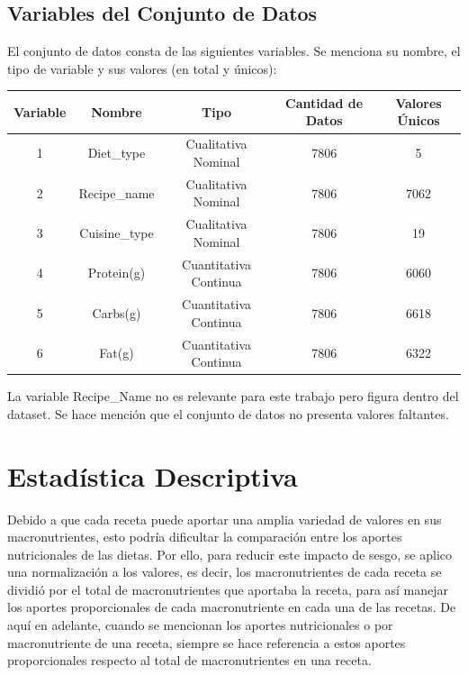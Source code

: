 \documentclass[12pt,a4paper]{article}
\begin{document}
    \subsection{Variables del Conjunto de Datos}
    El conjunto de datos consta de las siguientes variables. Se menciona su 
    nombre, el tipo de variable y sus valores (en total y únicos):
    \begin{center}
        \begin{tabular}{|c|c|c|c|c|}
            \hline
            Variable & Nombre & Tipo & Cantidad de Datos & Valores Únicos\\
            \hline
            1 & Diet\_type & Cualitativa Nominal & 7806 & 5 \\
            2 & Recipe\_name & Cualitativa Nominal & 7806 & 7062\\
            3 & Cuisine\_type & Cualitativa Nominal & 7806 & 19\\
            4 & Protein(g) & Cuantitativa Continua & 7806 & 6060\\
            5 & Carbs(g) & Cuantitativa Continua & 7806 & 6618\\
            6 & Fat(g) & Cuantitativa Continua & 7806 & 6322\\
            \hline
        \end{tabular}
    \end{center}
    La variable Recipe\_Name no es relevante para este trabajo pero figura 
    dentro del dataset. Se hace mención que el conjunto de datos no presenta 
    valores faltantes.

\newpage

\section{Estadística Descriptiva}
    Debido a que cada receta puede aportar una amplia variedad de valores 
    en sus macronutrientes, esto podría dificultar la comparación entre 
    los aportes nutricionales de las dietas. Por ello, para reducir este 
    impacto de sesgo, se aplico una normalización a los valores, es decir, 
    los macronutrientes de cada receta se dividió por el total de macronutrientes 
    que aportaba la receta, para así manejar los aportes proporcionales de 
    cada macronutriente en cada una de las recetas. De aquí en adelante, cuando 
    se mencionan los aportes nutricionales o por macronutriente de una receta, 
    siempre se hace referencia a estos aportes proporcionales respecto al total de 
    macronutrientes en una receta. 
\end{document}
